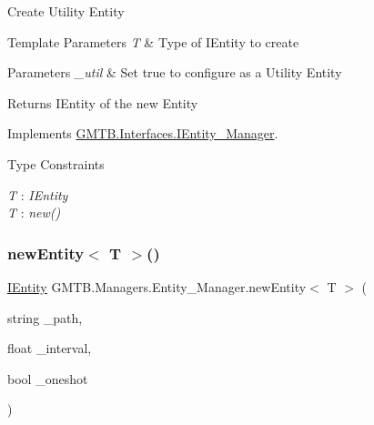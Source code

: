 Create Utility Entity 


\begin{DoxyTemplParams}{Template Parameters}
{\em T} & Type of I\+Entity to create \\
\hline
\end{DoxyTemplParams}

\begin{DoxyParams}{Parameters}
{\em \+\_\+util} & Set true to configure as a Utility Entity\\
\hline
\end{DoxyParams}
\begin{DoxyReturn}{Returns}
I\+Entity of the new Entity 
\end{DoxyReturn}


Implements \mbox{\hyperlink{interface_g_m_t_b_1_1_interfaces_1_1_i_entity___manager}{G\+M\+T\+B.\+Interfaces.\+I\+Entity\+\_\+\+Manager}}.

\begin{Desc}
\item[Type Constraints]\begin{description}
\item[{\em T} : {\em I\+Entity}]\item[{\em T} : {\em new()}]\end{description}
\end{Desc}
\mbox{\label{class_g_m_t_b_1_1_managers_1_1_entity___manager_a20f8a9eedc3a9d9295b037d9a477cd98}} 
\subsubsection{\texorpdfstring{newEntity$<$ T $>$()}{newEntity< T >()}\hspace{0.1cm}{\footnotesize\ttfamily [5/5]}}
{\footnotesize\ttfamily \mbox{\hyperlink{interface_g_m_t_b_1_1_interfaces_1_1_i_entity}{I\+Entity}} G\+M\+T\+B.\+Managers.\+Entity\+\_\+\+Manager.\+new\+Entity$<$ T $>$ (\begin{DoxyParamCaption}\item[{string}]{\+\_\+path,  }\item[{float}]{\+\_\+interval,  }\item[{bool}]{\+\_\+oneshot }\end{DoxyParamCaption})}



